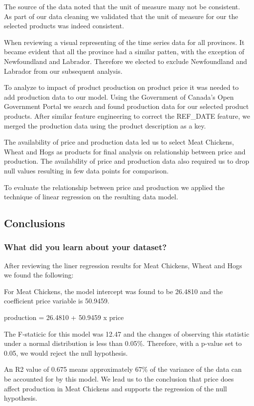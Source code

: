 The source of the data noted that the unit of measure many not be consistent. As part of our data cleaning we validated that the unit of measure for our the selected products was indeed consistent. 

When reviewing a visual representing of the time series data for all provinces. It became evident that all the province had a similar patten, with the exception of Newfoundland and Labrador. Therefore we elected to exclude Newfoundland and Labrador from our subsequent analysis.

To analyze to impact of product production on product price it was needed to add production data to our model. Using the Government of Canada’s Open Government Portal we search and found production data for our selected product products. After similar feature engineering to correct the REF_DATE feature, we merged the production data using the product description as a key. 

The availability of price and production data led us to select Meat Chickens, Wheat and Hogs as products for final analysis on relationship between price and production. The availability of price and production data also required us to drop null values resulting in few data points for comparison.

To evaluate the relationship between price and production we applied the technique of linear regression on the resulting data model.

\subsection{Conclusions}

\subsubsection{What did you learn about your dataset?}

After reviewing the liner regression results for Meat Chickens, Wheat and Hogs we found the following:

For Meat Chickens, the model intercept was found to be 26.4810 and the coefficient price variable is 50.9459. 

production = 26.4810 + 50.9459 x price

The F-staticic for this model was 12.47 and the changes of observing this statistic under a normal distribution is less than 0.05\%. Therefore, with a p-value set to 0.05, we would reject the null hypothesis. 

An R2 value of  0.675  means approximately 67\% of the variance of the data can be accounted for by this model. We lead us to the conclusion that price does affect production in Meat Chickens and supports the regression of the null hypothesis. 

